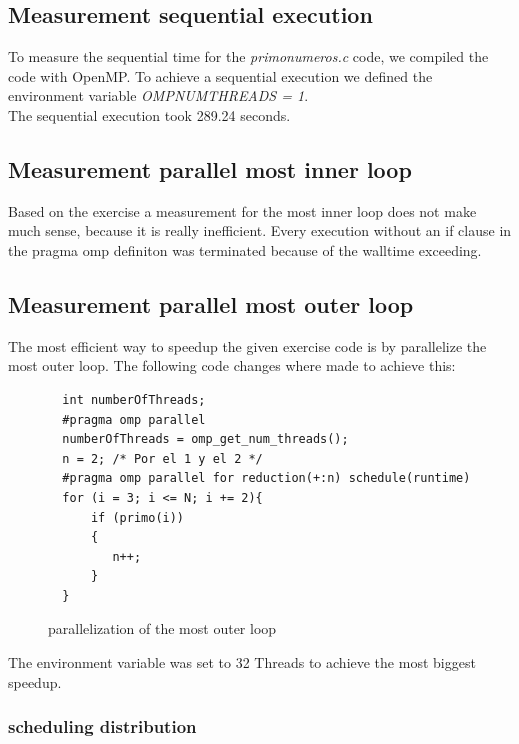 \documentclass[11pt,a4paper]{article}
\begin{document}
\subsection{Measurement sequential execution}

To measure the sequential time for the 
\textit{primo\textunderscore numeros\textunderscore .c} code, we compiled the code with OpenMP. To achieve a sequential execution we defined the environment variable
\textit{OMP\textunderscore NUM\textunderscore THREADS = 1}. \\
The sequential execution took 289.24 seconds.


\subsection{Measurement parallel most inner loop}

Based on the exercise a measurement for the most inner loop does not make much sense, because it is really inefficient. Every execution without an if clause in the pragma omp definiton was terminated because of the walltime exceeding.

\subsection{Measurement parallel most outer loop}

The most efficient way to speedup the given exercise code is by parallelize the most outer loop. The following code changes where made to achieve this:

\begin{figure}[h]
\label{code_mostouterloop}
\begin{lstlisting}
  int numberOfThreads;
  #pragma omp parallel
  numberOfThreads = omp_get_num_threads();
  n = 2; /* Por el 1 y el 2 */
  #pragma omp parallel for reduction(+:n) schedule(runtime)
  for (i = 3; i <= N; i += 2){
      if (primo(i))
      {
         n++;
      }
  }
\end{lstlisting} 
\caption{parallelization of the most outer loop}
\end{figure} 

The environment variable was set to 32 Threads to achieve the most biggest speedup.\\

\subsubsection{scheduling distribution}
\end{document}
